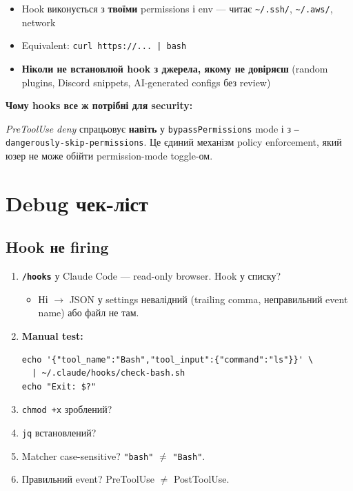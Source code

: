 \documentclass[11pt,a4paper]{article}
\begin{document}
\begin{itemize}
\item Hook виконується з \textbf{твоїми} permissions і env --- читає \texttt{\textasciitilde/.ssh/}, \texttt{\textasciitilde/.aws/}, network
\item Equivalent: \texttt{curl https://... | bash}
\item \textbf{Ніколи не встановлюй hook з джерела, якому не довіряєш} (random plugins, Discord snippets, AI-generated configs без review)
\end{itemize}

\textbf{Чому hooks все ж потрібні для security:}

\textit{PreToolUse deny} спрацьовує \textbf{навіть} у \texttt{bypassPermissions} mode і з \texttt{--dangerously-skip-permissions}. Це єдиний механізм policy enforcement, який юзер не може обійти permission-mode toggle-ом.

\section{Debug чек-ліст}

\subsection{Hook не firing}

\begin{enumerate}
\item \textbf{\texttt{/hooks}} у Claude Code --- read-only browser. Hook у списку?
\begin{itemize}
\item Ні $\to$ JSON у settings невалідний (trailing comma, неправильний event name) або файл не там.
\end{itemize}

\item \textbf{Manual test:}
\begin{lstlisting}
echo '{"tool_name":"Bash","tool_input":{"command":"ls"}}' \
  | ~/.claude/hooks/check-bash.sh
echo "Exit: $?"
\end{lstlisting}

\item \texttt{chmod +x} зроблений?
\item \texttt{jq} встановлений?
\item Matcher case-sensitive? \texttt{"bash"} $\ne$ \texttt{"Bash"}.
\item Правильний event? PreToolUse $\ne$ PostToolUse.
\end{enumerate}
\end{document}
